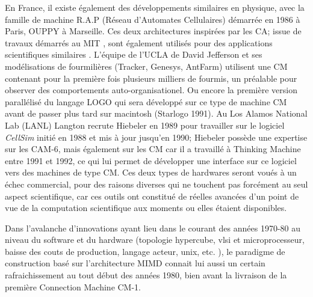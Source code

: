 En France, il existe également des développements similaires en physique, avec la famille de machine R.A.P (Réseau d’Automates Cellulaires) démarrée en 1986 à Paris, OUPPY à Marseille. Ces deux architectures inspirées par les CA; issue de travaux démarrés au MIT \autocites{Hillis1983, Toffoli1987}, sont également utilisés pour des applications scientifiques similaires \autocites{Epez1993, Toffoli2005}. L’équipe de l’UCLA de David Jefferson et ses modélisations de fourmilières (Tracker, Genesys, AntFarm) utilisent une CM contenant pour la première fois plusieurs milliers de fourmis, un préalable pour observer des comportements auto-organisationel. Ou encore la première version parallélisé du langage LOGO qui sera développé sur ce type de machine CM avant de passer plus tard sur macintosh (Starlogo 1991). Au Los Alamos National Lab (LANL) Langton recrute Hiebeler en 1989 pour travailler sur le logiciel \textit{CellSim} initié en 1988 et mis à jour jusqu’en 1990; Hiebeler possède une expertise sur les CAM-6, mais également sur les CM car il a travaillé à Thinking Machine entre 1991 et 1992, ce qui lui permet de développer une interface sur ce logiciel vers des machines de type CM. Ces deux types de hardwares seront voués à un échec commercial, pour des raisons diverses qui ne touchent pas forcément au seul aspect scientifique, car ces outils ont constitué de réelles avancées d’un point de vue de la computation scientifique aux moments ou elles étaient disponibles.

Dans l'avalanche d'innovations ayant lieu dans le courant des années 1970-80 au niveau du software et du hardware (topologie hypercube, vlsi et microprocesseur, baisse des couts de production, langage acteur, unix, etc. ), le paradigme de construction basé sur l'architecture MIMD  connait lui aussi un certain rafraichissement au tout début des années 1980, bien avant la livraison de la première Connection Machine CM-1.

